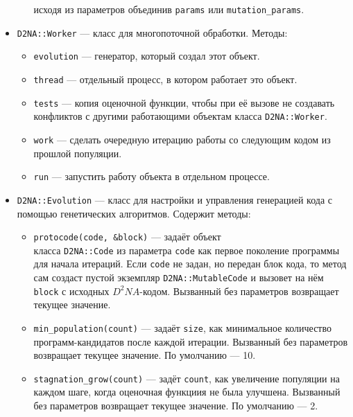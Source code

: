 \documentclass[utf8,a5paper,portrait,10pt,twoside]{eskdtext}
\begin{document}
\begin{itemize}
\begin{itemize}
               исходя из параметров объединив \texttt{params} или
               \texttt{mutation\_params}.
       \end{itemize}
  \item \texttt{D2NA::Worker} — класс для многопоточной обработки. Методы:
      \begin{itemize}
        \item \texttt{evolution} — генератор, который создал этот объект.
        \item \texttt{thread} — отдельный процесс, в котором работает это
              объект.
        \item \texttt{tests} — копия оценочной функции, чтобы при её вызове
              не создавать конфликтов с другими работающими объектам класса
              \texttt{D2NA::Worker}.
        \item \texttt{work} — сделать очередную итерацию работы со следующим
              кодом из прошлой популяции.
        \item \texttt{run} — запустить работу объекта в отдельном процессе.
      \end{itemize}
  \item \texttt{D2NA::Evolution} — класс для настройки и управления генерацией
        кода с помощью генетических алгоритмов. Содержит методы:
        \begin{itemize}
          \item \texttt{protocode(code, \&block)} — задаёт объект\\ класса
                \texttt{D2NA::Code} из параметра \texttt{code} как первое
                поколение программы для начала итераций. Если \texttt{code} не
                задан, но передан блок кода, то метод сам создаст пустой
                экземпляр \texttt{D2NA::MutableCode} и вызовет на нём
                \texttt{block} с исходных $D^2NA$-кодом. Вызванный без
                параметров возвращает текущее значение.
          \item \texttt{min\_population(count)} — задаёт \texttt{size}, как
                минимальное количество программ-кандидатов после каждой
                итерации. Вызванный без параметров возвращает текущее значение.
                По умолчанию — 10.
          \item \texttt{stagnation\_grow(count)} — задёт \texttt{count}, как
                увеличение популяции на каждом шаге, когда оценочная функциия
                не была улучшена. Вызванный без параметров возвращает текущее
                значение. По умолчанию — 2.

\end{itemize}
\end{itemize}
\end{document}
